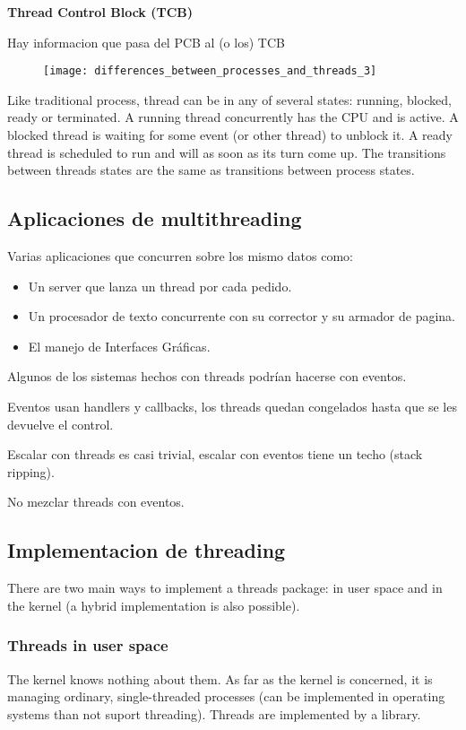 \documentclass[a4paper, twoside]{article}
\begin{document}
\textbf{Thread Control Block (TCB)}

Hay informacion que pasa del PCB al (o los) TCB

\begin{figure}[H]
	\centering
	\texttt{[image: differences\_between\_processes\_and\_threads\_3]}
	\label{fig:differences_between_processes_and_threads_3}
\end{figure}

Like traditional process, thread can be in any of several states: running, blocked, ready or terminated. A running thread concurrently has the CPU and is active. A blocked thread is waiting for some event (or other thread) to unblock it. A ready thread is scheduled to run and will as soon as its turn come up. The transitions between threads states are the same as transitions between process states.

\subsection{Aplicaciones de multithreading}
Varias aplicaciones que concurren sobre los mismo datos como:
\begin{itemize}
	\item Un server que lanza un thread por cada pedido.
	\item Un procesador de texto concurrente con su corrector y su armador de pagina.
	\item El manejo de Interfaces Gráficas.
\end{itemize}

Algunos de los sistemas hechos con threads podrían hacerse con eventos.

Eventos usan handlers y callbacks, los threads quedan congelados hasta que se les devuelve el control.

Escalar con threads es casi trivial, escalar con eventos tiene un techo (stack ripping).

No mezclar threads con eventos.

\subsection{Implementacion de threading}
There are two main ways to implement a threads package: in user space and in the kernel (a hybrid implementation is also possible).

\subsubsection{Threads in user space}
The kernel knows nothing about them. As far as the kernel is concerned, it is managing ordinary, single-threaded processes (can be implemented in operating systems than not suport threading). Threads are implemented by a library.
\end{document}
